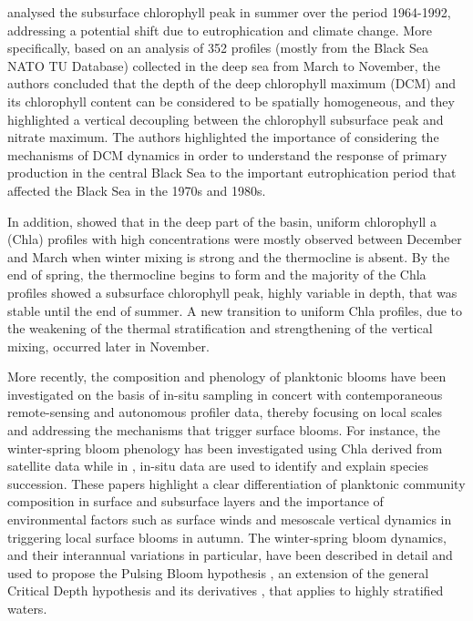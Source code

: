 \documentclass[journal abbreviation, manuscript]{copernicus}
\begin{document}
\citet{Yunev2005} analysed the subsurface chlorophyll peak in summer over the period 1964-1992, addressing a potential shift due to eutrophication and climate change.
More specifically, based on an analysis of 352 profiles (mostly from the Black Sea NATO TU Database) collected in the deep sea from March to November, the authors concluded that the depth of the deep chlorophyll maximum (DCM) and its chlorophyll content can be considered to be spatially homogeneous, and they highlighted a vertical decoupling between the chlorophyll subsurface peak and nitrate maximum.
The authors highlighted the importance of considering the mechanisms of DCM dynamics in order to understand the response of primary production in the central Black Sea to the important eutrophication period that affected the Black Sea in the 1970s and 1980s.

In addition, \citet{Finenko2005} showed that in the deep part of the basin, uniform chlorophyll a (Chla) profiles with high concentrations were mostly observed between December and March when winter mixing is strong and the thermocline is absent.
By the end of spring, the thermocline begins to form and the majority of the Chla profiles showed a subsurface chlorophyll peak, highly variable in depth, that was stable until the end of summer.
A new transition to uniform Chla profiles, due to the weakening of the thermal stratification and strengthening of the vertical mixing, occurred later in November.

More recently, the composition and phenology of planktonic blooms have been investigated on the basis of in-situ sampling in concert with contemporaneous remote-sensing and autonomous profiler data, thereby focusing on local scales and addressing the mechanisms that trigger surface blooms.
For instance, the winter-spring bloom phenology has been investigated using Chla derived from satellite data \citep{Mikaelyan2017a, Mikaelyan2017b} while in \citet{Mikaelyan2018}, in-situ data are used to identify and explain species succession.
These papers highlight a clear differentiation of planktonic community composition in surface and subsurface layers \citep{Mikaelyan2018,Mikaelyan2020} and the importance of environmental factors such as surface winds \citep{Mikaelyan2017a} and mesoscale vertical dynamics \citep{Mikaelyan2020} in triggering local surface blooms in autumn. 
The winter-spring bloom dynamics, and their interannual variations in particular, have been described in detail and used to propose the Pulsing Bloom hypothesis \citep{Mikaelyan2017b}, an extension of the general Critical Depth hypothesis and its derivatives \citep{Sverdrup1953, Huisman1999, Chiswell2015}, that applies to highly stratified waters.
\end{document}
